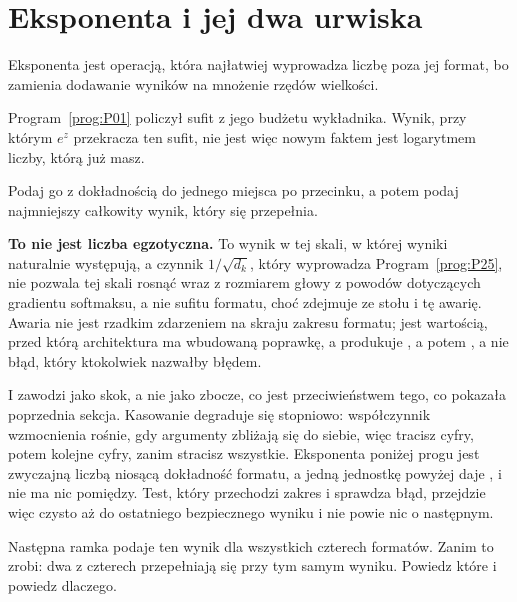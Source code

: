 \section{Eksponenta i jej dwa urwiska}
\label{sec:P02-cliffs}

\begin{fr}
Eksponenta jest operacją, która najłatwiej wyprowadza liczbę poza jej format,
bo zamienia dodawanie wyników na mnożenie rzędów wielkości.

Program~\ref{prog:P01} policzył sufit  z jego budżetu wykładnika.
Wynik, przy którym $e^{z}$ przekracza ten sufit, nie jest więc nowym faktem
\dash{} jest logarytmem liczby, którą już masz.

Podaj go z dokładnością do jednego miejsca po przecinku, a potem podaj
najmniejszy całkowity wynik, który się przepełnia.
\nextframe
\end{fr}

\begin{fr}

\textbf{To nie jest liczba egzotyczna.} To wynik w tej skali, w której wyniki
naturalnie występują, a czynnik $1/\sqrt{d_k}$, który wyprowadza
Program~\ref{prog:P25}, nie pozwala tej skali rosnąć wraz z rozmiarem głowy
\dash{} z powodów dotyczących gradientu softmaksu, a nie sufitu formatu, choć
zdejmuje ze stołu i tę awarię.
Awaria nie jest rzadkim zdarzeniem na skraju zakresu
formatu; jest wartością, przed którą architektura ma wbudowaną poprawkę, a
produkuje , a potem , a nie błąd, który ktokolwiek nazwałby
błędem.

I zawodzi jako skok, a nie jako zbocze, co jest przeciwieństwem tego, co
pokazała poprzednia sekcja. Kasowanie degraduje się stopniowo: współczynnik
wzmocnienia rośnie, gdy argumenty zbliżają się do siebie, więc tracisz cyfry,
potem kolejne cyfry, zanim stracisz wszystkie. Eksponenta poniżej progu jest
zwyczajną liczbą niosącą dokładność formatu, a jedną jednostkę powyżej daje
, i nie ma nic pomiędzy. Test, który przechodzi zakres i sprawdza
błąd, przejdzie więc czysto aż do ostatniego bezpiecznego wyniku i nie powie
nic o następnym.

Następna ramka podaje ten wynik dla wszystkich czterech formatów. Zanim to
zrobi: dwa z czterech przepełniają się przy tym samym wyniku. Powiedz które i
powiedz dlaczego.
\dotline
\nextframe
\end{fr}

